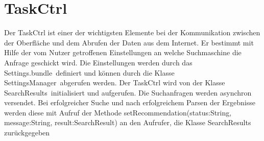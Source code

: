
\section{TaskCtrl}

Der TaskCtrl ist einer der wichtigsten Elemente bei der Kommunikation zwischen der Oberfläche und dem Abrufen der Daten aus dem Internet. Er bestimmt mit Hilfe der vom Nutzer getroffenen Einstellungen an welche Suchmaschine die Anfrage geschickt wird. Die Einstellungen werden durch das \glqq Settings.bundle\grqq\ definiert und können durch die Klasse \glqq SettingsManager\grqq\ abgerufen werden.   Der TaskCtrl wird von der Klasse \glqq SearchResults\grqq\ initialisiert und aufgerufen. Die Suchanfragen werden asynchron versendet. Bei erfolgreicher Suche und nach erfolgreichem Parsen der Ergebnisse werden diese mit Aufruf der Methode \glqq setRecommendation(status:String, message:String, result:SearchResult) \grqq\xspace an den Aufrufer, die Klasse SearchResults zurückgegeben 

